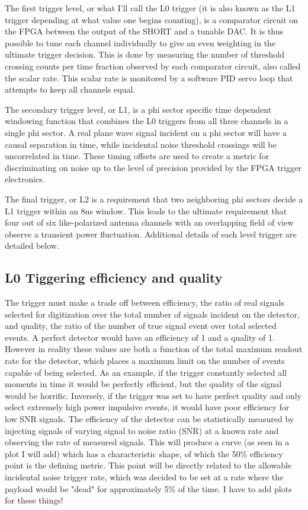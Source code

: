 		The first trigger level, or what I'll call the L0 trigger (it is also known as the L1 trigger depending at what value one begins counting), is a comparator circuit on the FPGA between the output of the SHORT and a tunable DAC. It is thus possible to tune each channel individually to give an even weighting in the ultimate trigger decision.  This is done by measuring the number of threshold crossing counts per time fraction observed by each comparator circuit, also called the scalar rate.  This scalar rate is monitored by a software PID servo loop that attempts to keep all channels equal.
		
		The secondary trigger level, or L1, is a phi sector specific time dependent windowing function that combines the L0 triggers from all three channels in a single phi sector.  A real plane wave signal incident on a phi sector will have a causal separation in time, while incidental noise threshold crossings will be uncorrelated in time.  These timing offsets are used to create a metric for discriminating on noise up to the level of precision provided by the FPGA trigger electronics.  
		
		The final trigger, or L2 is a requirement that two neighboring phi sectors decide a L1 trigger within an 8ns window.  This leads to the ultimate requirement that four out of six like-polarized antenna channels with an overlapping field of view observe a transient power fluctuation.  Additional details of each level trigger are detailed below.
		

	\subsection{L0 Tiggering efficiency and quality}
		The trigger must make a trade off between efficiency, the ratio of real signals selected for digitization over the total number of signals incident on the detector, and quality, the ratio of the number of true signal event over total selected events.  A perfect detector would have an efficiency of 1 and a quality of 1.  However in reality these values are both a function of the total maximum readout rate for the detector, which places a maximum limit on the number of events capable of being selected.  As an example, if the trigger constantly selected all moments in time it would be perfectly efficient, but the quality of the signal would be horrific.  Inversely, if the trigger was set to have perfect quality and only select extremely high power impulsive events, it would have poor efficiency for low SNR signals.  The efficiency of the detector can be statistically measured by injecting signals of varying signal to noise ratio (SNR) at a known rate and observing the rate of measured signals.  This will produce a curve (as seen in a plot I will add) which has a characteristic shape, of which the 50\% efficiency point is the defining metric.  This point will be directly related to the allowable incidental noise trigger rate, which was decided to be set at a rate where the payload would be "dead" for approximately 5\% of the time.  I have to add plots for these things!
		
